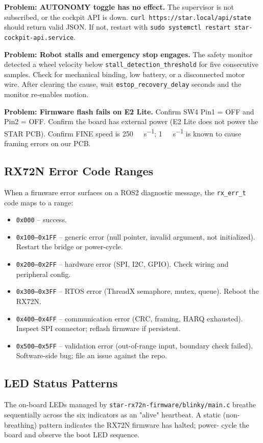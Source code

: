 \documentclass[11pt,letterpaper]{article}
\begin{document}
\textbf{Problem: AUTONOMY toggle has no effect.} The supervisor is
not subscribed, or the cockpit API is down. \texttt{curl
https://star.local/api/state} should return valid JSON. If not,
restart with \texttt{sudo systemctl restart
star-cockpit-api.service}.

\textbf{Problem: Robot stalls and emergency stop engages.} The
safety monitor detected a wheel velocity below
\texttt{stall\_detection\_threshold} for five consecutive samples.
Check for mechanical binding, low battery, or a disconnected motor
wire. After clearing the cause, wait
\texttt{estop\_recovery\_delay} seconds and the monitor re-enables
motion.

\textbf{Problem: Firmware flash fails on E2 Lite.} Confirm SW4
Pin1 = OFF and Pin2 = OFF. Confirm the board has external power (E2
Lite does not power the STAR PCB). Confirm FINE speed is
\qty{250}{\kilo\bit\per\second}; \qty{1}{\mega\bit\per\second} is
known to cause framing errors on our PCB.

\subsection{RX72N Error Code Ranges}
When a firmware error surfaces on a ROS2 diagnostic message, the
\texttt{rx\_err\_t} code maps to a range:
\begin{itemize}[leftmargin=1.4em,itemsep=2pt]
\item \texttt{0x000} -- success.
\item \texttt{0x100--0x1FF} -- generic error (null pointer, invalid
      argument, not initialized). Restart the bridge or power-cycle.
\item \texttt{0x200--0x2FF} -- hardware error (SPI, I2C, GPIO).
      Check wiring and peripheral config.
\item \texttt{0x300--0x3FF} -- RTOS error (ThreadX semaphore,
      mutex, queue). Reboot the RX72N.
\item \texttt{0x400--0x4FF} -- communication error (CRC, framing,
      HARQ exhausted). Inspect SPI connector; reflash firmware if
      persistent.
\item \texttt{0x500--0x5FF} -- validation error (out-of-range
      input, boundary check failed). Software-side bug; file an
      issue against the repo.
\end{itemize}

\subsection{LED Status Patterns}
The on-board LEDs managed by
\texttt{star-rx72n-firmware/blinky/main.c} breathe sequentially
across the six indicators as an "alive" heartbeat. A static (non-
breathing) pattern indicates the RX72N firmware has halted; power-
cycle the board and observe the boot LED sequence.
\end{document}
